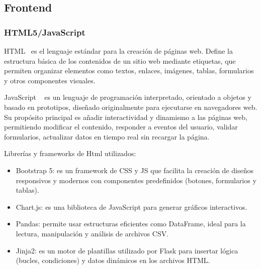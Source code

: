 \subsection{Frontend}

\subsubsection{HTML5/JavaScript}
HTML~\cite{Html} es el lenguaje estándar para la creación de páginas web. Define la estructura básica de los contenidos de un sitio web mediante etiquetas, que permiten organizar elementos como textos, enlaces, imágenes, tablas, formularios y otros componentes visuales.


JavaScript ~\cite{JavaScript} es un lenguaje de programación interpretado, orientado a objetos y basado en prototipos, diseñado originalmente para ejecutarse en navegadores web. Su propósito principal es añadir interactividad y dinamismo a las páginas web, permitiendo modificar el contenido, responder a eventos del usuario, validar formularios, actualizar datos en tiempo real sin recargar la página.

Librerías y frameworks de Html utilizados:
\begin{itemize}
    \item {Bootstrap 5}: es un framework de CSS y JS que facilita la creación de diseños responsivos y modernos con componentes predefinidos (botones, formularios y tablas).
    \item {Chart.js}: es una biblioteca de JavaScript para generar gráficos interactivos.
    \item {Pandas}: permite usar estructuras eficientes como DataFrame, ideal para la lectura, manipulación y análisis de archivos CSV.
    \item {Jinja2}: es un motor de plantillas utilizado por Flask para insertar lógica (bucles, condiciones) y datos dinámicos en los archivos HTML.
\end{itemize}

